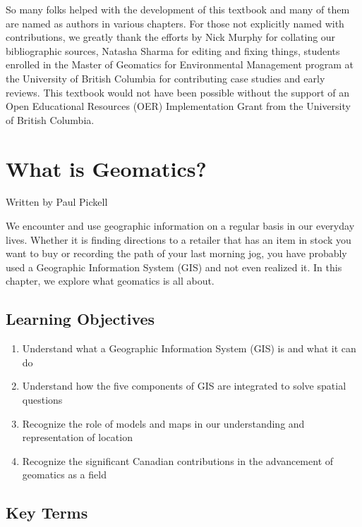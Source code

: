 \documentclass[
]{book}
\providecommand{\tightlist}{%
  \setlength{\itemsep}{0pt}\setlength{\parskip}{0pt}}
\begin{document}
So many folks helped with the development of this textbook and many of them are named as authors in various chapters. For those not explicitly named with contributions, we greatly thank the efforts by Nick Murphy for collating our bibliographic sources, Natasha Sharma for editing and fixing things, students enrolled in the Master of Geomatics for Environmental Management program at the University of British Columbia for contributing case studies and early reviews. This textbook would not have been possible without the support of an Open Educational Resources (OER) Implementation Grant from the University of British Columbia.

\hypertarget{what-is-geomatics}{%
\chapter{What is Geomatics?}\label{what-is-geomatics}}

Written by
Paul Pickell

We encounter and use geographic information on a regular basis in our everyday lives. Whether it is finding directions to a retailer that has an item in stock you want to buy or recording the path of your last morning jog, you have probably used a Geographic Information System (GIS) and not even realized it. In this chapter, we explore what geomatics is all about.

\hypertarget{learning-objectives}{%
\section*{Learning Objectives}\label{learning-objectives}}

\begin{enumerate}
\def\labelenumi{\arabic{enumi}.}
\tightlist
\item
  Understand what a Geographic Information System (GIS) is and what it can do
\item
  Understand how the five components of GIS are integrated to solve spatial questions
\item
  Recognize the role of models and maps in our understanding and representation of location
\item
  Recognize the significant Canadian contributions in the advancement of geomatics as a field
\end{enumerate}

\hypertarget{key-terms}{%
\section*{Key Terms}\label{key-terms}}
\end{document}
